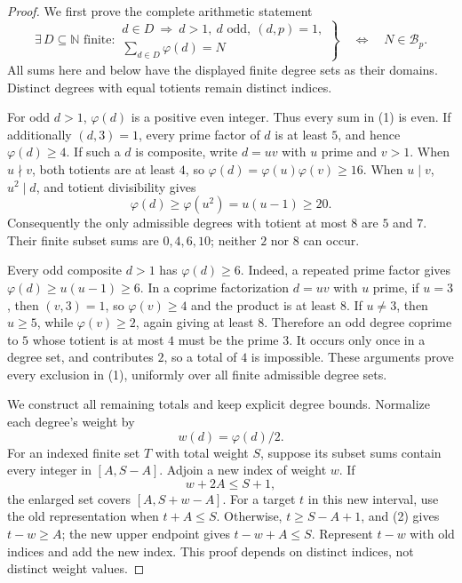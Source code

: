 \documentclass[11pt]{article}
\begin{document}
\begin{proof}
We first prove the complete arithmetic statement
\[
 \exists\,D\subseteq\mathbb N\text{ finite}:
 \left.
 \begin{array}{l}
  d\in D\ \Longrightarrow\ d>1,\ d\text{ odd},\ (d,p)=1,\\
  \displaystyle\sum_{d\in D}\varphi(d)=N
 \end{array}\right\}
 \quad\Longleftrightarrow\quad N\in\mathcal B_p.             \tag{1}
\]
All sums here and below have the displayed finite degree sets as their
domains. Distinct degrees with equal totients remain distinct indices.

For odd \(d>1\), \(\varphi(d)\) is a positive even integer. Thus every
sum in (1) is even. If additionally \((d,3)=1\), every prime factor of
\(d\) is at least \(5\), and hence \(\varphi(d)\ge4\).
If such a \(d\) is composite, write \(d=uv\) with \(u\) prime and
\(v>1\). When \(u\nmid v\), both totients are at least \(4\), so
\(\varphi(d)=\varphi(u)\varphi(v)\ge16\). When \(u\mid v\),
\(u^2\mid d\), and totient divisibility gives
\[
                  \varphi(d)\ge\varphi(u^2)=u(u-1)\ge20.
\]
Consequently the only admissible degrees with totient at most \(8\)
are \(5\) and \(7\). Their finite subset sums are \(0,4,6,10\);
neither \(2\) nor \(8\) can occur.

Every odd composite \(d>1\) has \(\varphi(d)\ge6\).
Indeed, a repeated prime factor gives
\(\varphi(d)\ge u(u-1)\ge6\). In a coprime factorization \(d=uv\)
with \(u\) prime, if \(u=3\), then \((v,3)=1\), so
\(\varphi(v)\ge4\) and the product is at least \(8\).
If \(u\ne3\), then \(u\ge5\), while \(\varphi(v)\ge2\), again giving
at least \(8\). Therefore an odd degree coprime to \(5\) whose totient
is at most \(4\) must be the prime \(3\). It occurs only once in a
degree set, and contributes \(2\), so a total of \(4\) is impossible.
These arguments prove every exclusion in (1), uniformly over all
finite admissible degree sets.

We construct all remaining totals and keep explicit degree bounds.
Normalize each degree's weight by
\[
                              w(d)=\varphi(d)/2.
\]
For an indexed finite set \(T\) with total weight \(S\), suppose its
subset sums contain every integer in \([A,S-A]\).
Adjoin a new index of weight \(w\). If
\[
                              w+2A\le S+1,                  \tag{2}
\]
the enlarged set covers \([A,S+w-A]\).
For a target \(t\) in this new interval, use the old representation
when \(t+A\le S\). Otherwise,
\(t\ge S-A+1\), and (2) gives \(t-w\ge A\); the new upper endpoint
gives \(t-w+A\le S\). Represent \(t-w\) with old indices and add the
new index. This proof depends on distinct indices, not distinct
weight values.


\end{proof}
\end{document}
